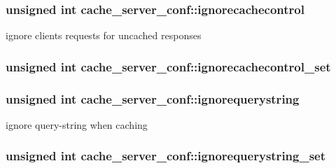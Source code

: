 \subsubsection[{\texorpdfstring{ignorecachecontrol}{ignorecachecontrol}}]{\setlength{\rightskip}{0pt plus 5cm}unsigned {\bf int} cache\+\_\+server\+\_\+conf\+::ignorecachecontrol}\hypertarget{structcache__server__conf_a2372aa3f5b681975bd629bb1c865735d}{}\label{structcache__server__conf_a2372aa3f5b681975bd629bb1c865735d}
ignore client\textquotesingle{}s requests for uncached responses 
\subsubsection[{\texorpdfstring{ignorecachecontrol\+\_\+set}{ignorecachecontrol_set}}]{\setlength{\rightskip}{0pt plus 5cm}unsigned {\bf int} cache\+\_\+server\+\_\+conf\+::ignorecachecontrol\+\_\+set}\hypertarget{structcache__server__conf_a6053341dcea0ffb126a47e9678b07024}{}\label{structcache__server__conf_a6053341dcea0ffb126a47e9678b07024}
\subsubsection[{\texorpdfstring{ignorequerystring}{ignorequerystring}}]{\setlength{\rightskip}{0pt plus 5cm}unsigned {\bf int} cache\+\_\+server\+\_\+conf\+::ignorequerystring}\hypertarget{structcache__server__conf_a120515fffd1d3598dfd49107c9f67de9}{}\label{structcache__server__conf_a120515fffd1d3598dfd49107c9f67de9}
ignore query-\/string when caching 
\subsubsection[{\texorpdfstring{ignorequerystring\+\_\+set}{ignorequerystring_set}}]{\setlength{\rightskip}{0pt plus 5cm}unsigned {\bf int} cache\+\_\+server\+\_\+conf\+::ignorequerystring\+\_\+set}\hypertarget{structcache__server__conf_a34dfe2dbc76181f06753cf1a40907b50}{}\label{structcache__server__conf_a34dfe2dbc76181f06753cf1a40907b50}
